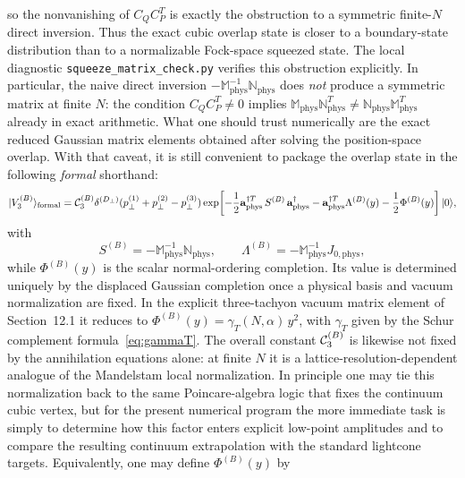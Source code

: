 \documentclass[11pt]{article}
\numberwithin{equation}{section}
\newcommand{\perpD}{D_\perp}
\begin{document}
so the nonvanishing of $C_QC_P^T$ is exactly the obstruction to a symmetric finite-$N$ direct inversion. Thus the exact cubic overlap state is closer to a boundary-state distribution than to a normalizable Fock-space squeezed state. The local diagnostic \texttt{squeeze\_matrix\_check.py} verifies this obstruction explicitly. In particular, the naive direct inversion $-\mathbb M_{\mathrm{phys}}^{-1}\mathbb N_{\mathrm{phys}}$ does \emph{not} produce a symmetric matrix at finite $N$: the condition $C_QC_P^T\neq 0$ implies $\mathbb M_{\mathrm{phys}}\mathbb N_{\mathrm{phys}}^T\neq \mathbb N_{\mathrm{phys}}\mathbb M_{\mathrm{phys}}^T$ already in exact arithmetic. What one should trust numerically are the exact reduced Gaussian matrix elements obtained after solving the position-space overlap. With that caveat, it is still convenient to package the overlap state in the following \emph{formal} shorthand:
\begin{equation}
|V_3^{(B)}\rangle_{\mathrm{formal}} =
{\cal C}_3^{(B)}
\delta^{(\perpD)}(p_\perp^{(1)}+p_\perp^{(2)}-p_\perp^{(3)})
\exp\!\left[
 -\frac12 {\bf a}_{\mathrm{phys}}^{\dagger T}\,S^{(B)}\,{\bf a}_{\mathrm{phys}}^\dagger
 -{\bf a}_{\mathrm{phys}}^{\dagger T}\Lambda^{(B)}(y)
 -\frac12\Phi^{(B)}(y)
\right]|0\rangle,
\label{eq:V3B-squeezed}
\end{equation}
with
\begin{equation}
S^{(B)} = -\mathbb M_{\mathrm{phys}}^{-1}\mathbb N_{\mathrm{phys}},
\qquad
\Lambda^{(B)} = -\mathbb M_{\mathrm{phys}}^{-1}J_{0,\mathrm{phys}},
\label{eq:V3B-formal-data}
\end{equation}
while $\Phi^{(B)}(y)$ is the scalar normal-ordering completion. Its value is determined uniquely by the displaced Gaussian completion once a physical basis and vacuum normalization are fixed. In the explicit three-tachyon vacuum matrix element of Section~12.1 it reduces to $\Phi^{(B)}(y)=\gamma_T(N,\alpha)\,y^2$, with $\gamma_T$ given by the Schur complement formula~\eqref{eq:gammaT}. The overall constant ${\cal C}_3^{(B)}$ is likewise not fixed by the annihilation equations alone: at finite $N$ it is a lattice-resolution-dependent analogue of the Mandelstam local normalization. In principle one may tie this normalization back to the same Poincare-algebra logic that fixes the continuum cubic vertex, but for the present numerical program the more immediate task is simply to determine how this factor enters explicit low-point amplitudes and to compare the resulting continuum extrapolation with the standard lightcone targets. Equivalently, one may define $\Phi^{(B)}(y)$ by
\end{document}
